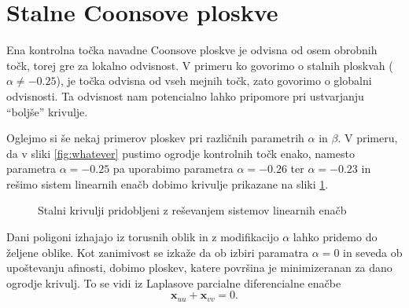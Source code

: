 \documentclass[a4paper,12pt]{article}
\begin{document}
\section{Stalne Coonsove ploskve}


Ena kontrolna točka navadne Coonsove ploskve je odvisna od osem obrobnih točk, 
torej gre za lokalno odvisnost. V primeru ko govorimo o stalnih ploskvah 
($\alpha \neq  -0.25$), je točka odvisna od vseh mejnih točk, zato govorimo 
o globalni odvisnosti. Ta odvisnost nam potencialno lahko pripomore pri ustvarjanju 
``boljše'' krivulje.

Oglejmo si še nekaj primerov ploskev pri različnih parametrih $\alpha$ in $\beta$.
V primeru, da v sliki \ref{fig:whatever} pustimo ogrodje kontrolnih točk enako,
namesto parametra $\alpha =- 0.25$ pa uporabimo 
parametra $\alpha = -0.26$ ter $\alpha = -0.23$ in rešimo sistem
linearnih enačb dobimo krivulje prikazane na sliki \ref{fig:coons_pospl}.

\begin{figure}[ht!]
   \centering
   \caption{Stalni krivulji pridobljeni z reševanjem sistemov linearnih enačb}
\label{fig:coons_pospl}
\end{figure}






Dani poligoni izhajajo iz torusnih oblik in z modifikacijo $\alpha$ lahko pridemo do željene oblike.
Kot zanimivost se izkaže da ob izbiri paramatra $\alpha = 0$ in seveda ob upoštevanju afinosti,
dobimo ploskev, katere površina je minimizeranan za dano ogrodje krivulj. To se vidi iz Laplasove parcialne 
diferencialne enačbe
$$\mathbf{x}_{uu} + \mathbf{x}_{vv} = 0.$$
\end{document}
